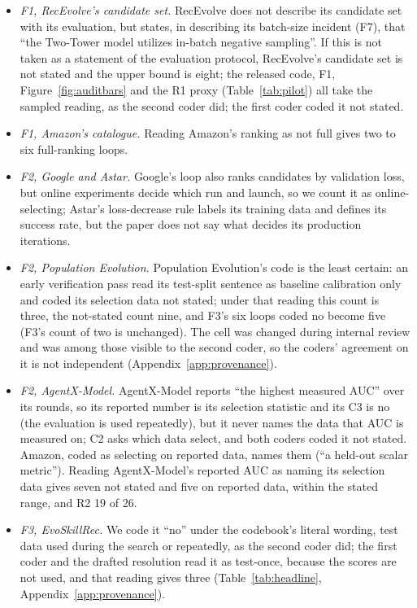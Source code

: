 \documentclass[sigconf,nonacm]{acmart}
\begin{document}
\begin{itemize}
\item \emph{F1, RecEvolve's candidate set.} RecEvolve does not describe its candidate set with its evaluation, but states, in describing its batch-size incident (F7), that ``the Two-Tower model utilizes in-batch negative sampling''. If this is not taken as a statement of the evaluation protocol, RecEvolve's candidate set is not stated and the upper bound is eight; the released code, F1, Figure~\ref{fig:auditbars} and the R1 proxy (Table~\ref{tab:pilot}) all take the sampled reading, as the second coder did; the first coder coded it not stated.
\item \emph{F1, Amazon's catalogue.} Reading Amazon's ranking as not full gives two to six full-ranking loops.
\item \emph{F2, Google and Astar.} Google's loop also ranks candidates by validation loss, but online experiments decide which run and launch, so we count it as online-selecting; Astar's loss-decrease rule labels its training data and defines its success rate, but the paper does not say what decides its production iterations.
\item \emph{F2, Population Evolution.} Population Evolution's code is the least certain: an early verification pass read its test-split sentence as baseline calibration only and coded its selection data not stated; under that reading this count is three, the not-stated count nine, and F3's six loops coded no become five (F3's count of two is unchanged). The cell was changed during internal review and was among those visible to the second coder, so the coders' agreement on it is not independent (Appendix~\ref{app:provenance}).
\item \emph{F2, AgentX-Model.} AgentX-Model reports ``the highest measured AUC'' over its rounds, so its reported number is its selection statistic and its C3 is no (the evaluation is used repeatedly), but it never names the data that AUC is measured on; C2 asks which data select, and both coders coded it not stated. Amazon, coded as selecting on reported data, names them (``a held-out scalar metric''). Reading AgentX-Model's reported AUC as naming its selection data gives seven not stated and five on reported data, within the stated range, and R2 19 of 26.
\item \emph{F3, EvoSkillRec.} We code it ``no'' under the codebook's literal wording, test data used during the search or repeatedly, as the second coder did; the first coder and the drafted resolution read it as test-once, because the scores are not used, and that reading gives three (Table~\ref{tab:headline}, Appendix~\ref{app:provenance}).

\end{itemize}
\end{document}
